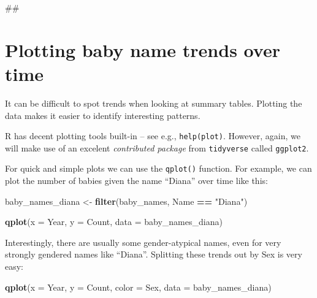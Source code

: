 \documentclass[]{book}
\newenvironment{Shaded}{\begin{snugshade}}{\end{snugshade}}
\newcommand{\KeywordTok}[1]{\textcolor[rgb]{0.13,0.29,0.53}{\textbf{#1}}}
\newcommand{\DataTypeTok}[1]{\textcolor[rgb]{0.13,0.29,0.53}{#1}}
\newcommand{\StringTok}[1]{\textcolor[rgb]{0.31,0.60,0.02}{#1}}
\newcommand{\OperatorTok}[1]{\textcolor[rgb]{0.81,0.36,0.00}{\textbf{#1}}}
\newcommand{\NormalTok}[1]{#1}
\begin{document}
\begin{Shaded}
\begin{Highlighting}[]
\NormalTok{##}
\end{Highlighting}
\end{Shaded}

\section{Plotting baby name trends over
time}\label{plotting-baby-name-trends-over-time}

It can be difficult to spot trends when looking at summary tables.
Plotting the data makes it easier to identify interesting patterns.

R has decent plotting tools built-in -- see e.g., \texttt{help(plot)}.
However, again, we will make use of an excelent \emph{contributed
package} from \texttt{tidyverse} called \texttt{ggplot2}.

For quick and simple plots we can use the \texttt{qplot()} function. For
example, we can plot the number of babies given the name ``Diana'' over
time like this:

\begin{Shaded}
\begin{Highlighting}[]
\NormalTok{baby_names_diana <-}\StringTok{ }\KeywordTok{filter}\NormalTok{(baby_names, Name }\OperatorTok{==}\StringTok{ "Diana"}\NormalTok{)}
\end{Highlighting}
\end{Shaded}

\begin{Shaded}
\begin{Highlighting}[]
\KeywordTok{qplot}\NormalTok{(}\DataTypeTok{x =}\NormalTok{ Year, }\DataTypeTok{y =}\NormalTok{ Count,}
     \DataTypeTok{data =}\NormalTok{ baby_names_diana)}
\end{Highlighting}
\end{Shaded}

Interestingly, there are usually some gender-atypical names, even for
very strongly gendered names like ``Diana''. Splitting these trends out
by Sex is very easy:

\begin{Shaded}
\begin{Highlighting}[]
\KeywordTok{qplot}\NormalTok{(}\DataTypeTok{x =}\NormalTok{ Year, }\DataTypeTok{y =}\NormalTok{ Count, }\DataTypeTok{color =}\NormalTok{ Sex,}
      \DataTypeTok{data =}\NormalTok{ baby_names_diana)}
\end{Highlighting}
\end{Shaded}
\end{document}
